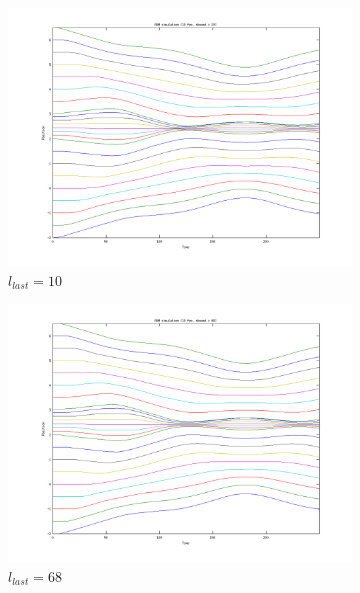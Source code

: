 \documentclass[11pt]{article}
\begin{document}
\begin{figure}[H]
    \begin{subfigure}{0.3\textwidth}
        \includegraphics[width=\textwidth]{../images/atomic_multiscale_10fps_10sbound.png}
        \caption{$l_{last} = 10$}
        \label{fig:atomic_multi_10sbound}
    \end{subfigure}
    \begin{subfigure}{0.3\textwidth}
        \includegraphics[width=\textwidth]{../images/atomic_multiscale_10fps_68sbound.png}
        \caption{$l_{last} = 68$}
        \label{fig:atomic_multi_68sbound}
    \end{subfigure}
    \begin{subfigure}{0.3\textwidth}

\end{subfigure}
\end{figure}
\end{document}
